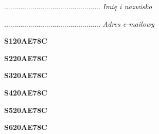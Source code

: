 \begin{turn}{90}\begin{minipage}{\linewidth} \vspace{20mm} ................................................  \textit{Imię i nazwisko}\end{minipage}\end{turn}

\begin{turn}{90}\begin{minipage}{\linewidth} \vspace{20mm} ................................................  \textit{Adres e-mailowy}\end{minipage}\end{turn}

\begin{turn}{90}\huge \begin{minipage}{\linewidth} \vspace{10mm}\textbf{S120AE78C}\end{minipage}\end{turn}

\begin{turn}{90}\huge \begin{minipage}{\linewidth} \vspace{10mm}\textbf{S220AE78C}\end{minipage}\end{turn}

\begin{turn}{90}\huge \begin{minipage}{\linewidth} \vspace{10mm}\textbf{S320AE78C}\end{minipage}\end{turn}

\begin{turn}{90}\huge \begin{minipage}{\linewidth} \vspace{10mm}\textbf{S420AE78C}\end{minipage}\end{turn}

\begin{turn}{90}\huge \begin{minipage}{\linewidth} \vspace{10mm}\textbf{S520AE78C}\end{minipage}\end{turn}

\begin{turn}{90}\huge \begin{minipage}{\linewidth} \vspace{10mm}\textbf{S620AE78C}\end{minipage}\end{turn}

